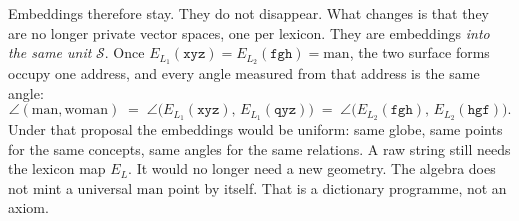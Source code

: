 \documentclass[12pt, a4paper]{article}
\begin{document}
Embeddings therefore stay. They do not disappear.
What changes is that they are no longer private vector spaces, one
per lexicon. They are embeddings \emph{into the same unit}
$\mathcal{S}$. Once $E_{L_1}(\texttt{xyz})=E_{L_2}(\texttt{fgh})=\mathrm{man}$,
the two surface forms occupy one address, and every angle measured
from that address is the same angle:
\begin{equation}
    \angle(\mathrm{man},\mathrm{woman})
    \;=\;
    \angle\bigl(E_{L_1}(\texttt{xyz}),\,E_{L_1}(\texttt{qyz})\bigr)
    \;=\;
    \angle\bigl(E_{L_2}(\texttt{fgh}),\,E_{L_2}(\texttt{hgf})\bigr).
    \label{eq:uniform_angles}
\end{equation}
Under that proposal the embeddings would be uniform: same globe, same points for the same
concepts, same angles for the same relations. A raw string still
needs the lexicon map $E_L$. It would no longer need a new geometry.
The algebra does not mint a universal $\mathrm{man}$ point by itself. That is a dictionary programme, not an axiom.
\end{document}
